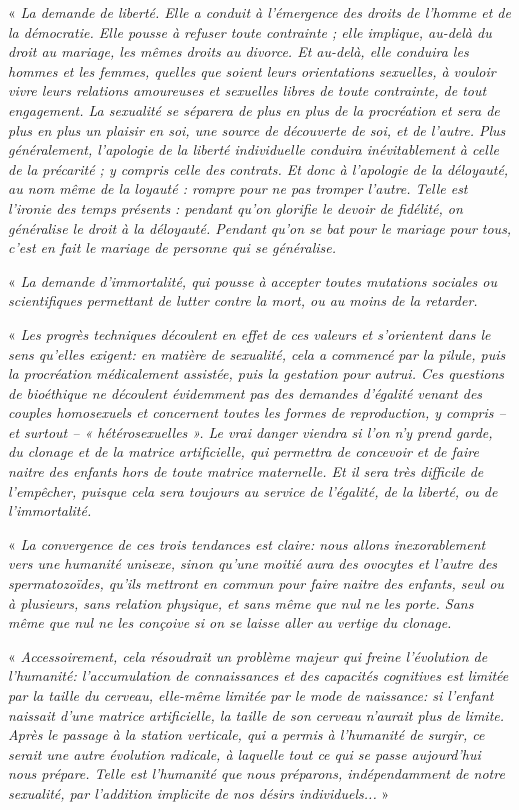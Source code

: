 « \emph{\secundo La demande de liberté. Elle a conduit à l'émergence des droits de l'homme et de la démocratie. Elle pousse à refuser toute contrainte ; elle implique, au-delà du droit au mariage, les mêmes droits au divorce. Et au-delà, elle conduira les hommes et les femmes, quelles que soient leurs orientations sexuelles, à vouloir vivre leurs relations amoureuses et sexuelles libres de toute contrainte, de tout engagement. La sexualité se séparera de plus en plus de la procréation et sera de plus en plus un plaisir en soi, une source de découverte de soi, et de l'autre. Plus généralement, l'apologie de la liberté individuelle conduira inévitablement à celle de la précarité ; y compris celle des contrats. Et donc à l'apologie de la déloyauté, au nom même de la loyauté : rompre pour ne pas tromper l'autre. Telle est l'ironie des temps présents : pendant qu'on glorifie le devoir de fidélité, on généralise le droit à la déloyauté. Pendant qu'on se bat pour le mariage pour tous, c'est en fait le mariage de personne qui se généralise.}
 
« \emph{\tertio La demande d'immortalité, qui pousse à accepter toutes mutations sociales ou scientifiques permettant de lutter contre la mort, ou au moins de la retarder.}
 
« \emph{\quarto Les progrès techniques découlent en effet de ces valeurs et s'orientent dans le sens qu'elles exigent: en matière de sexualité, cela a commencé par la pilule, puis la procréation médicalement assistée, puis la gestation pour autrui. Ces questions de bioéthique ne découlent évidemment pas des demandes d'égalité venant des couples homosexuels et concernent toutes les formes de reproduction, y compris -- et surtout -- « hétérosexuelles ». Le vrai danger viendra si l'on n'y prend garde, du clonage et de la matrice artificielle, qui permettra de concevoir et de faire naitre des enfants hors de toute matrice maternelle. Et il sera très difficile de l'empêcher, puisque cela sera toujours au service de l'égalité, de la liberté, ou de l'immortalité.}
 
« \emph{ La convergence de ces trois tendances est claire: nous allons inexorablement vers une humanité unisexe, sinon qu'une moitié aura des ovocytes et l'autre des spermatozoïdes, qu'ils mettront en commun pour faire naitre des enfants, seul ou à plusieurs, sans relation physique, et sans même que nul ne les porte. Sans même que nul ne les conçoive si on se laisse aller au vertige du clonage.}
 
« \emph{ Accessoirement, cela résoudrait un problème majeur qui freine l'évolution de l'humanité: l'accumulation de connaissances et des capacités cognitives est limitée par la taille du cerveau, elle-même limitée par le mode de naissance: si l'enfant naissait d'une matrice artificielle, la taille de son cerveau n'aurait plus de limite. Après le passage à la station verticale, qui a permis à l'humanité de surgir, ce serait une autre évolution radicale, à laquelle tout ce qui se passe aujourd'hui nous prépare. Telle est l'humanité que nous préparons, indépendamment de notre sexualité, par l'addition implicite de nos désirs individuels...} »

